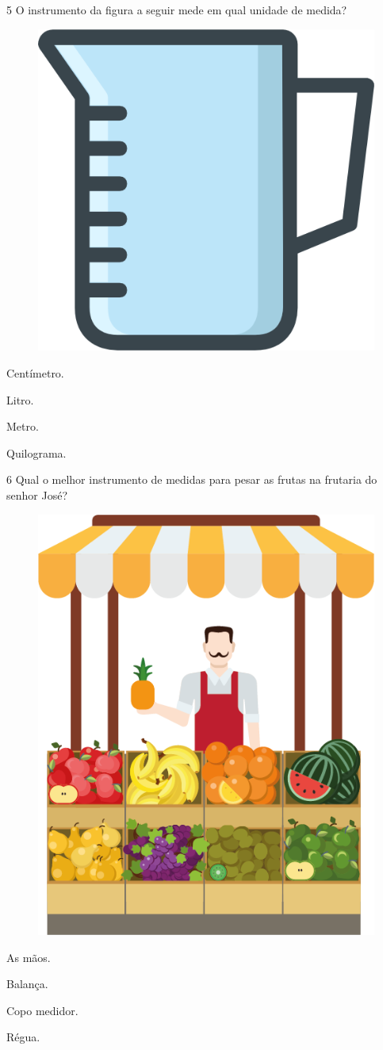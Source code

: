 \num{5} O instrumento da figura a seguir mede em qual unidade de medida?

\begin{figure}[H]
\centering
\includegraphics[width=.3\textwidth]{./media/image153.png}
\end{figure}\enlargethispage{2\baselineskip}

\begin{escolha}[itemsep=-5pt]
\begin{multicols}{2}
\item Centímetro.

\item Litro.

\item Metro.

\item Quilograma.
\end{multicols}
\end{escolha}

\num{6} Qual o melhor instrumento de medidas para pesar as frutas na frutaria do
senhor José?

\begin{figure}[H]
\centering
\includegraphics[width=.3\textwidth]{./media/image154.png}
\end{figure}

\begin{escolha}[itemsep=-5pt]
\item As mãos.

\item Balança.

\item Copo medidor.

\item Régua.
\end{escolha}

